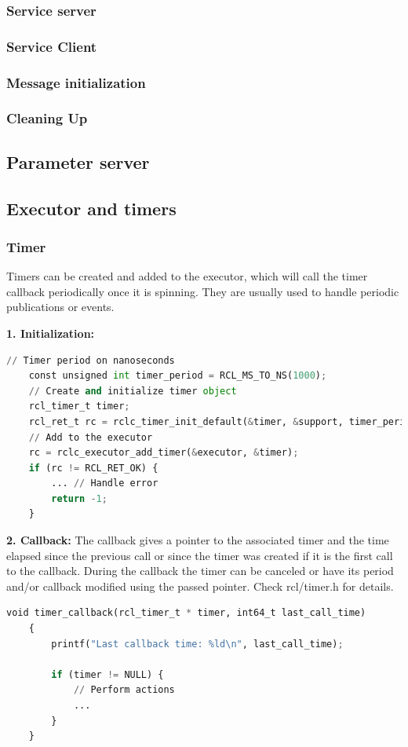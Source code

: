 \subsubsection{Service server}
\subsubsection{Service Client}
\subsubsection{Message initialization}
\subsubsection{Cleaning Up}


\subsection{Parameter server}

\subsection{Executor and timers}
\subsubsection{Timer}
Timers can be created and added to the executor, which will call the timer callback periodically once it is spinning. They are usually used to handle periodic publications or events.

\textbf{1. Initialization:}
\begin{lstlisting}[language=Python, caption=Timer Initialization]
    // Timer period on nanoseconds
    const unsigned int timer_period = RCL_MS_TO_NS(1000);
    // Create and initialize timer object
    rcl_timer_t timer;
    rcl_ret_t rc = rclc_timer_init_default(&timer, &support, timer_period, timer_callback);
    // Add to the executor
    rc = rclc_executor_add_timer(&executor, &timer);
    if (rc != RCL_RET_OK) {
        ... // Handle error
        return -1;
    }    
\end{lstlisting}

\textbf{2. Callback:} The callback gives a pointer to the associated timer and the time elapsed since the previous call or since the timer was created if it is the first call to the callback. During the callback the timer can be canceled or have its period and/or callback modified using the passed pointer. Check rcl/timer.h for details.
\begin{lstlisting}[language=Python, caption=Timer Callback]
    void timer_callback(rcl_timer_t * timer, int64_t last_call_time)
    {
        printf("Last callback time: %ld\n", last_call_time);
    
        if (timer != NULL) {
            // Perform actions
            ...
        }
    }  
\end{lstlisting}

